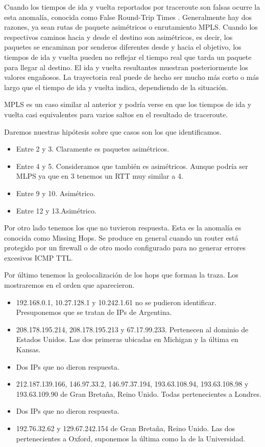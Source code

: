 Cuando los tiempos de ida y vuelta reportados por traceroute son falsas ocurre la esta anomalía, conocida
como False Round-Trip Times . Generalmente hay dos razones, ya sean rutas de paquete asimétricos o enrutamiento
MPLS. Cuando los respectivos caminos hacia y desde el destino son asimétricos, es decir, los paquetes se
encaminan por senderos diferentes desde y hacia el objetivo, los tiempos de ida y vuelta pueden no
reflejar el tiempo real que tarda un paquete para llegar al destino. El ida y vuelta resultantes muestran
posteriormente los valores engañosos. La trayectoria real puede de hecho ser mucho más corto o más largo
que el tiempo de ida y vuelta indica, dependiendo de la situación.

MPLS es un caso similar al anterior y podría verse en que los tiempos de ida y vuelta casi equivalentes
para varios saltos en el resultado de traceroute.

Daremos nuestras hipótesis sobre que casos son los que identificamos.

\begin{itemize}
\item Entre 2 y 3. Claramente es paquetes asimétricos.
\item Entre 4 y 5. Consideramos que también es asimétricos. Aunque podría ser MLPS ya que en 3 tenemos un
RTT muy similar a 4.
\item Entre 9 y 10. Asimétrico.
\item Entre 12 y 13.Asimétrico.
\end{itemize}



Por otro lado tenemos los que no tuvieron respuesta. Esta es la anomalía es conocida como Missing Hops.
Se produce en general cuando un router está protegido por un firewall o de otro modo configurado para no
generar errores excesivos ICMP TTL.



Por último tenemos la geolocalización de los hops que forman la traza. Los mostraremos en el orden que
aparecieron.

\begin{itemize}
\item 192.168.0.1, 10.27.128.1 y 10.242.1.61 no se pudieron identificar. Presuponemos que se tratan de IPs
de Argentina.
\item 208.178.195.214, 208.178.195.213 y 67.17.99.233. Pertenecen al dominio de Estados Unidos. Las dos
primeras ubicadas en Michigan y la última en Kansas.
\item Dos IPs que no dieron respuesta.
\item 212.187.139.166, 146.97.33.2, 146.97.37.194, 193.63.108.94, 193.63.108.98 y 193.63.109.90 de
Gran Bretaña, Reino Unido. Todas pertenecientes a Londres.
\item Dos IPs que no dieron respuesta.
\item 192.76.32.62 y 129.67.242.154 de Gran Bretaña, Reino Unido. Las dos pertenecientes a Oxford, suponemos
la última como la de la Universidad.
\end{itemize}

